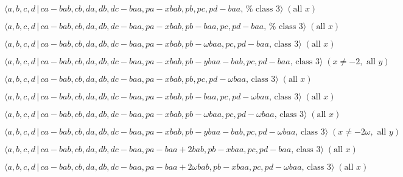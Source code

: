 \documentclass[10pt]{article}
\begin{document}
\begin{equation}
\langle a,b,c,d\,|\,ca-bab,cb,da,db,dc-baa,pa-xbab,pb,pc,pd-baa,\,\text{%
class }3\rangle \;(\text{all }x)  \tag{7.3540}
\end{equation}

\begin{equation}
\langle a,b,c,d\,|\,ca-bab,cb,da,db,dc-baa,pa-xbab,pb-baa,pc,pd-baa,\,\text{%
class }3\rangle \;(\text{all }x)  \tag{7.3541}
\end{equation}

\begin{equation}
\langle a,b,c,d\,|\,ca-bab,cb,da,db,dc-baa,pa-xbab,pb-\omega baa,pc,pd-baa,\,%
\text{class }3\rangle \;(\text{all }x)  \tag{7.3542}
\end{equation}

\begin{equation}
\langle a,b,c,d\,|\,ca-bab,cb,da,db,dc-baa,pa-xbab,pb-ybaa-bab,pc,pd-baa,\,%
\text{class }3\rangle \;(x\neq -2,\text{ all }y)  \tag{7.3543}
\end{equation}

\begin{equation}
\langle a,b,c,d\,|\,ca-bab,cb,da,db,dc-baa,pa-xbab,pb,pc,pd-\omega baa,\,%
\text{class }3\rangle \;(\text{all }x)  \tag{7.3544}
\end{equation}

\begin{equation}
\langle a,b,c,d\,|\,ca-bab,cb,da,db,dc-baa,pa-xbab,pb-baa,pc,pd-\omega baa,\,%
\text{class }3\rangle \;(\text{all }x)  \tag{7.3545}
\end{equation}

\begin{equation}
\langle a,b,c,d\,|\,ca-bab,cb,da,db,dc-baa,pa-xbab,pb-\omega
baa,pc,pd-\omega baa,\,\text{class }3\rangle \;(\text{all }x)  \tag{7.3546}
\end{equation}

\begin{equation}
\langle a,b,c,d\,|\,ca-bab,cb,da,db,dc-baa,pa-xbab,pb-ybaa-bab,pc,pd-\omega
baa,\,\text{class }3\rangle \;(x\neq -2\omega ,\text{ all }y)  \tag{7.3547}
\end{equation}

\begin{equation}
\langle a,b,c,d\,|\,ca-bab,cb,da,db,dc-baa,pa-baa+2bab,pb-xbaa,pc,pd-baa,\,%
\text{class }3\rangle \;(\text{all }x)  \tag{7.3548}
\end{equation}

\begin{equation}
\langle a,b,c,d\,|\,ca-bab,cb,da,db,dc-baa,pa-baa+2\omega
bab,pb-xbaa,pc,pd-\omega baa,\,\text{class }3\rangle \;(\text{all }x) 
\tag{7.3549}
\end{equation}
\end{document}
